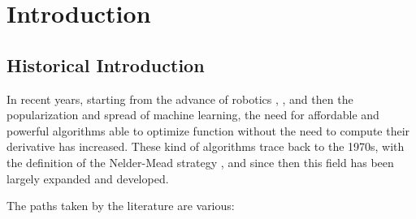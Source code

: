 
\chapter{Introduction}\label{introduction}

\section{Historical Introduction}

In recent years, starting from the advance of robotics \cite{Theodorou2010}, \cite{Ruckstieß2010},  and then the popularization and spread of machine learning, the need for affordable and powerful algorithms able to optimize function without the need to compute their derivative has increased. These kind of algorithms trace back to the 1970s, with the definition of the Nelder-Mead strategy \cite{NelderMead}, and since then this field has been largely expanded and developed.

The paths taken by the literature are various: 

